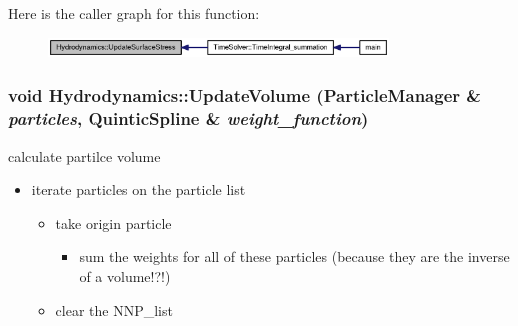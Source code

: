 Here is the caller graph for this function:\nopagebreak
\begin{figure}[H]
\begin{center}
\leavevmode
\includegraphics[width=256pt]{classHydrodynamics_f5b2c4ad14824e4b6192faa6f60f4014_icgraph}
\end{center}
\end{figure}
\hypertarget{classHydrodynamics_09a3f5a5c055e0efc822fdf80f40cd7d}{
\subsubsection[{UpdateVolume}]{\setlength{\rightskip}{0pt plus 5cm}void Hydrodynamics::UpdateVolume ({\bf ParticleManager} \& {\em particles}, \/  {\bf QuinticSpline} \& {\em weight\_\-function})}}
\label{classHydrodynamics_09a3f5a5c055e0efc822fdf80f40cd7d}


calculate partilce volume 



\begin{itemize}
\item iterate particles on the particle list

\begin{itemize}
\item take origin particle

\begin{itemize}
\item sum the weights for all of these particles (because they are the inverse of a volume!?!)\end{itemize}


\item clear the NNP\_\-list\end{itemize}
\end{itemize}


